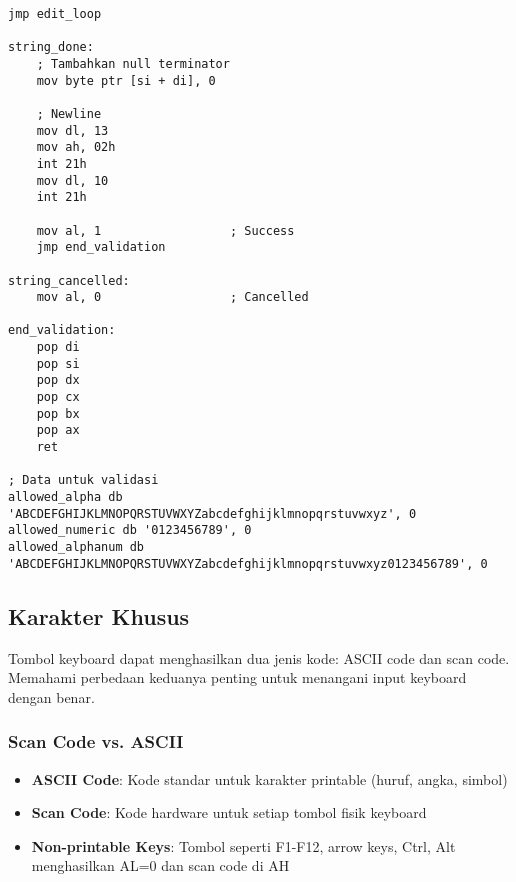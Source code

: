 \documentclass[../main.tex]{subfiles}
\begin{document}
\begin{lstlisting}[language={[x86masm]Assembler}, caption=Validasi Input dengan Edit Line, label={lst:input-validation}]
    jmp edit_loop
    
string_done:
    ; Tambahkan null terminator
    mov byte ptr [si + di], 0
    
    ; Newline
    mov dl, 13
    mov ah, 02h
    int 21h
    mov dl, 10
    int 21h
    
    mov al, 1                  ; Success
    jmp end_validation
    
string_cancelled:
    mov al, 0                  ; Cancelled
    
end_validation:
    pop di
    pop si
    pop dx
    pop cx
    pop bx
    pop ax
    ret

; Data untuk validasi
allowed_alpha db 'ABCDEFGHIJKLMNOPQRSTUVWXYZabcdefghijklmnopqrstuvwxyz', 0
allowed_numeric db '0123456789', 0
allowed_alphanum db 'ABCDEFGHIJKLMNOPQRSTUVWXYZabcdefghijklmnopqrstuvwxyz0123456789', 0
\end{lstlisting}

\subsection{Karakter Khusus}
            Tombol keyboard dapat menghasilkan dua jenis kode: ASCII code dan scan code. Memahami perbedaan keduanya penting untuk menangani input keyboard dengan benar.

            \subsubsection{Scan Code vs. ASCII}
\begin{itemize}
    \item \textbf{ASCII Code}: Kode standar untuk karakter printable (huruf, angka, simbol)
    \item \textbf{Scan Code}: Kode hardware untuk setiap tombol fisik keyboard
    \item \textbf{Non-printable Keys}: Tombol seperti F1-F12, arrow keys, Ctrl, Alt menghasilkan AL=0 dan scan code di AH
\end{itemize}
\end{document}
